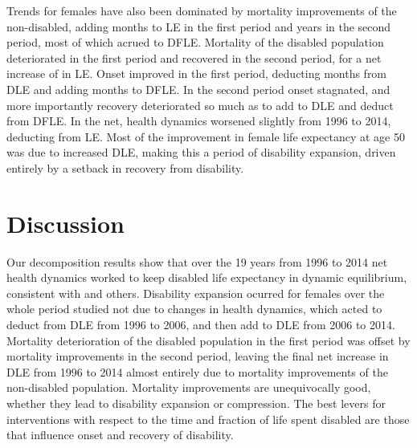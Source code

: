 \begin{table}[!ht]
      \caption{Females (all education combined) Contributions of changes in each transition to the change in each expectancy.}
      \label{tab:females}
      \centering
{}
     \qquad
{}
\end{table}

Trends for females have also been dominated by mortality improvements of the non-disabled, adding  months to LE in the first period and  years in the second period, most of which acrued to DFLE. Mortality of the disabled population deteriorated in the first period and recovered in the second period, for a net increase of  in LE. Onset improved in the first period, deducting  months from DLE and adding  months to DFLE. In the second period onset stagnated, and more importantly recovery deteriorated so much as to add  to DLE and deduct  from DFLE. In the net, health dynamics worsened slightly from 1996 to 2014, deducting  from LE. Most of the improvement in female life expectancy at age 50 was due to increased DLE, making this a period of disability expansion, driven entirely by a setback in recovery from disability.


\section{Discussion}
\label{sec:discussion}
Our decomposition results show that over the 19 years from 1996 to 2014 net health dynamics worked to keep disabled life expectancy in dynamic equilibrium, consistent with \citet{manton1982changing} and others. Disability expansion ocurred for females over the whole period studied not due to changes in health dynamics, which acted to deduct  from DLE from 1996 to 2006, and then add  to DLE from 2006 to 2014. Mortality deterioration of the disabled population in the first period was offset by mortality improvements in the second period, leaving the final net increase in DLE from 1996 to 2014 almost entirely due to mortality improvements of the non-disabled population. Mortality improvements are unequivocally good, whether they lead to disability expansion or compression. The best levers for interventions with respect to the time and fraction of life spent disabled are those that influence onset and recovery of disability.

